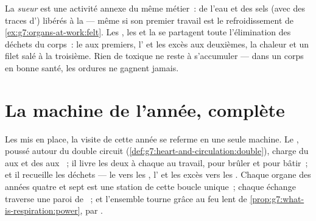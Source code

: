 \begin{remark}\label{rem:g7:removing-wastes:sweat}
La \emph{sueur} est une activité annexe du même
métier~: de l'eau et des sels (avec des traces d') libérés à la
 --- même si son premier travail est le refroidissement de
\cref{ex:g7:organs-at-work:felt}. Les , les  et la 
se partagent toute l'élimination des déchets du corps~: le  aux premiers, l' et les excès aux deuxièmes, la
chaleur et un filet salé à la troisième. Rien de toxique ne reste à
s'accumuler --- dans un corps en bonne santé, les ordures ne
gagnent jamais.
\end{remark}

\section{La machine de l'année, complète}

\begin{proposition}\label{prop:g7:removing-wastes:complete}
Les  mis en place, la visite de cette année se referme en une
seule machine. Le , poussé autour du double circuit
(\cref{def:g7:heart-and-circulation:double}), charge du 
aux  et des  aux ~; il livre les deux à
chaque  au travail, pour brûler et pour bâtir~; et il
recueille les déchets --- le  vers les ,
l' et les excès vers les . Chaque organe des années quatre
et sept est une station de cette boucle unique~; chaque échange
traverse une paroi de ~; et l'ensemble tourne grâce au feu
lent de \cref{prop:g7:what-is-respiration:power},  par
.
\end{proposition}
\admitted

